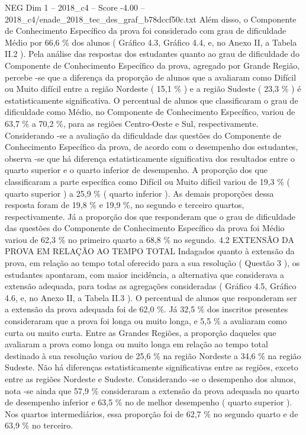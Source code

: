 \begin{textsample}{NEG Dim 1 – 2018\_c4 – Score -4.00 – 2018\_c4/enade\_2018\_tec\_des\_graf\_b78dccf50c.txt}
Além disso, o Componente de Conhecimento Específico da prova foi considerado com grau de dificuldade Médio por 66,6 \% dos alunos ( Gráfico 4.3, Gráfico 4.4, e, no Anexo II, a Tabela II.2 ).
Pela análise das respostas dos estudantes quanto ao grau de dificuldade do Componente de Conhecimento Específico da prova, agregado por Grande Região, percebe -se que a diferença da proporção de alunos que a avaliaram como Difícil ou Muito difícil entre a região Nordeste ( 15,1 \% ) e a região Sudeste ( 23,3 \% ) é estatisticamente significativa.
O percentual de alunos que classificaram o grau de dificuldade como Médio, no Componente de Conhecimento Específico, variou de 63,7 \% a 70,2 \%, para as regiões Centro-Oeste e Sul, respectivamente.
Considerando -se a avaliação da dificuldade das questões do Componente de Conhecimento Específico da prova, de acordo com o desempenho dos estudantes, observa -se que há diferença estatisticamente significativa dos resultados entre o quarto superior e o quarto inferior de desempenho.
A proporção dos que classificaram a parte específica como Difícil ou Muito difícil variou de 19,3 \% ( quarto superior ) a 25,9 \% ( quarto inferior ).
As demais proporções dessa resposta foram de 19,8 \% e 19,9 \%, no segundo e terceiro quartos, respectivamente.
Já a proporção dos que responderam que o grau de dificuldade das questões do Componente de Conhecimento Específico da prova foi Médio variou de 62,3 \% no primeiro quarto a 68,8 \% no segundo. 4.2 EXTENSÃO DA PROVA EM RELAÇÃO AO TEMPO TOTAL Indagados quanto à extensão da prova, em relação ao tempo total oferecido para a sua resolução ( Questão 3 ), os estudantes apontaram, com maior incidência, a alternativa que considerava a extensão adequada, para todas as agregações consideradas ( Gráfico 4.5, Gráfico 4.6, e, no Anexo II, a Tabela II.3 ).
O percentual de alunos que responderam ser a extensão da prova adequada foi de 62,0 \%.
Já 32,5 \% dos inscritos presentes consideraram que a prova foi longa ou muito longa, e 5,5 \% a avaliaram como curta ou muito curta.
Entre as Grandes Regiões, a proporção daqueles que avaliaram a prova como longa ou muito longa em relação ao tempo total destinado à sua resolução variou de 25,6 \% na região Nordeste a 34,6 \% na região Sudeste.
Não há diferenças estatisticamente significativas entre as regiões, exceto entre as regiões Nordeste e Sudeste.
Considerando -se o desempenho dos alunos, nota -se ainda que 57,9 \% consideraram a extensão da prova adequada no quarto de desempenho inferior e 63,5 \% no de melhor desempenho ( quarto superior ).
Nos quartos intermediários, essa proporção foi de 62,7 \% no segundo quarto e de 63,9 \% no terceiro.

\end{textsample}
